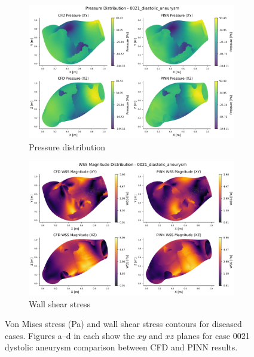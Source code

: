 \documentclass[12pt, a4paper]{article}
\begin{document}
\begin{figure}[H]
    \centering
    \scriptsize
    \begin{subfigure}{0.9\textwidth}
        \includegraphics[width=\textwidth]{0021_diastolic_aneurysm/pressure_distribution_0021_diastolic_aneurysm.png}
        \caption{\small Pressure distribution}
    \end{subfigure}
    \begin{subfigure}{0.9\textwidth}
        \includegraphics[width=\textwidth]{0021_diastolic_aneurysm/wss_magnitude_distribution_0021_diastolic_aneurysm.png}
        \caption{\small Wall shear stress}
    \end{subfigure}
    \caption{Von Mises stress (Pa) and wall shear stress contours for diseased cases. Figures a–d in each show the \(xy\) and \(xz\) planes for case 0021 dystolic aneurysm comparison between CFD and PINN results.}
    \label{fig:PINN_results1}
\end{figure}
\end{document}
